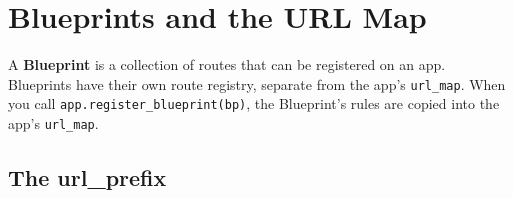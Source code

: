 \begin{codebox}[short]

\begin{Shaded}
\begin{Highlighting}[]
\NormalTok{(}\OperatorTok{=}\NormalTok{[}\NormalTok{])        }
\NormalTok{(}\OperatorTok{=}\NormalTok{[}\NormalTok{])       }

\NormalTok{(}\OperatorTok{=}\NormalTok{[}\NormalTok{])     }
\NormalTok{(}\OperatorTok{=}\NormalTok{[}\NormalTok{])     }
\NormalTok{(}\OperatorTok{=}\NormalTok{[}\NormalTok{])  }
\end{Highlighting}
\end{Shaded}

\end{codebox}

\setcounter{section}{5}
\section{Blueprints and the URL Map}\label{32-routing:326-blueprints-and-the-url-map}

A \textbf{Blueprint} is a collection of routes that can be registered on an app. Blueprints have their own route registry, separate from the app's \texttt{url\_map}. When you call \texttt{app.}\allowbreak{}\texttt{register\_}\allowbreak{}\texttt{blueprint(bp)}, the Blueprint's rules are copied into the app's \texttt{url\_map}.

\subsection*{The url\_prefix}\label{32-routing:the-url-prefix}

